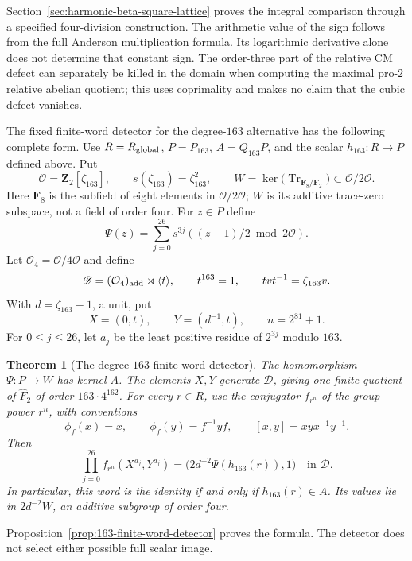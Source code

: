 \documentclass[11pt,a4paper]{article}
\newtheorem{theorem}{Theorem}[section]
\theoremstyle{definition}
\theoremstyle{remark}
\newcommand{\Z}{\mathbf Z}
\newcommand{\F}{\mathbf F}
\begin{document}
Section~\ref{sec:harmonic-beta-square-lattice} proves the integral
comparison through a specified four-division construction. The
arithmetic value of the sign follows from the full Anderson
multiplication formula. Its logarithmic derivative alone does
not determine that constant sign. The order-three part of the
relative CM defect can separately be killed in the domain when
computing the maximal pro-$2$ relative abelian quotient; this uses
coprimality and makes no claim that the cubic defect vanishes.

The fixed finite-word detector for the degree-$163$ alternative has
the following complete form. Use $R=R_{\rm global}$, $P=P_{163}$,
$A=Q_{163}P$, and the scalar $h_{163}:R\to P$ defined above. Put
\[
 \mathcal O=\Z_2[\zeta_{163}],\qquad
 s(\zeta_{163})=\zeta_{163}^2,\qquad
 W=\ker\bigl(\operatorname{Tr}_{\F_8/\F_2}\bigr)
       \subset\mathcal O/2\mathcal O.
\]
Here $\F_8$ is the subfield of eight elements in
$\mathcal O/2\mathcal O$; $W$ is its additive trace-zero subspace,
not a field of order four. For $z\in P$ define
\[
 \Psi(z)=\sum_{j=0}^{26}s^{3j}
       \left((z-1)/2\bmod2\mathcal O\right).
\]
Let $\mathcal O_4=\mathcal O/4\mathcal O$ and define
\[
 \mathscr D=(\mathcal O_4)_{\rm add}\rtimes\langle t\rangle,
 \qquad t^{163}=1,\qquad tvt^{-1}=\zeta_{163}v.
\]
With $d=\zeta_{163}-1$, a unit, put
\[
 X=(0,t),\qquad Y=(d^{-1},t),\qquad n=2^{81}+1.
\]
For $0\le j\le26$, let $a_j$ be the least positive residue of
$2^{3j}$ modulo $163$.

\begin{theorem}[The degree-$163$ finite-word detector]
\label{thm:main-163-finite-word}
The homomorphism $\Psi:P\to W$ has kernel $A$. The elements $X,Y$
generate $\mathscr D$, giving one finite quotient of $\widehat F_2$
of order $163\cdot4^{162}$. For every $r\in R$, use the conjugator
$f_{r^n}$ of the group power $r^n$, with conventions
\[
 \phi_f(x)=x,\qquad \phi_f(y)=f^{-1}yf,\qquad
 [x,y]=xyx^{-1}y^{-1}.
\]
Then
\[
 \prod_{j=0}^{26}f_{r^n}(X^{a_j},Y^{a_j})
      =\bigl(2d^{-2}\Psi(h_{163}(r)),1\bigr)
      \quad\text{in }\mathscr D.
\]
In particular, this word is the identity if and only if
$h_{163}(r)\in A$. Its values lie in $2d^{-2}W$, an additive
subgroup of order four.
\end{theorem}

Proposition~\ref{prop:163-finite-word-detector} proves the formula.
The detector does not select either possible full scalar image.
\end{document}
